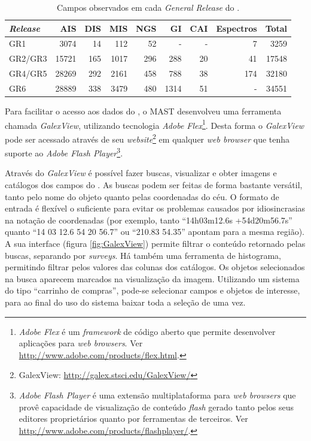 \begin{table}
	\caption[Campos observados em cada {\em General Release} do \galex.]{Campos
	observados em cada {\em General Release} do \galex.}
	\begin{tabular}{l r r r r r r r r}
		{\em Release} & AIS   & DIS & MIS  & NGS & GI   & CAI & Espectros & Total \\
		\midrule
		GR1           & 3074  & 14  & 112  & 52  & -    & -   & 7         & 3259  \\
		GR2/GR3       & 15721 & 165 & 1017 & 296 & 288  & 20  & 41        & 17548 \\
		GR4/GR5       & 28269 & 292 & 2161 & 458 & 788  & 38  & 174       & 32180 \\
		GR6           & 28889 & 338 & 3479 & 480 & 1314 & 51  & -         & 34551 \\
	\end{tabular}
	\label{tab:GalexReleases}
\end{table}

Para facilitar o acesso aos dados do \galex, o MAST desenvolveu uma ferramenta
chamada {\em GalexView}, utilizando tecnologia {\em Adobe Flex}\footnote{{\em
Adobe Flex} é um {\em framework} de código aberto que permite desenvolver
aplicações para {\em web browsers}. Ver
\url{http://www.adobe.com/products/flex.html}.}. Desta forma o {\em GalexView }
pode ser acessado através de seu {\em website}\footnote{GalexView:
\url{http://galex.stsci.edu/GalexView/}} em qualquer {\em web browser} que tenha
suporte ao {\em Adobe Flash Player}\footnote{{\em Adobe Flash Player} é uma
extensão multiplataforma para {\em web browsers} que provê capacidade de
visualização de conteúdo {\em flash} gerado tanto pelos seus editores
proprietários quanto por ferramentas de terceiros. Ver
\url{http://www.adobe.com/products/flashplayer/}.}.

Através do {\em GalexView} é possível fazer buscas, visualizar e obter imagens e
catálogos dos campos do \galex. As buscas podem ser feitas de forma bastante
versátil, tanto pelo nome do objeto quanto pelas coordenadas do céu. O formato
de entrada é flexível o suficiente para evitar os problemas causados por
idiosincrasias na notação de coordenadas (por exemplo, tanto ``14h03m12.6s
+54d20m56.7s'' quanto ``14 03 12.6 54 20 56.7'' ou ``210.83 54.35'' apontam para
a mesma região). A sua interface (figura \ref{fig:GalexView}) permite filtrar o
conteúdo retornado pelas buscas, separando por {\em surveys}. Há também uma
ferramenta de histograma, permitindo filtrar pelos valores das colunas dos
catálogos. Os objetos selecionados na busca aparecem marcados na visualização da
imagem. Utilizando um sistema do tipo ``carrinho de compras'', pode-se
selecionar campos e objetos de interesse, para ao final do uso do sistema baixar
toda a seleção de uma vez.

